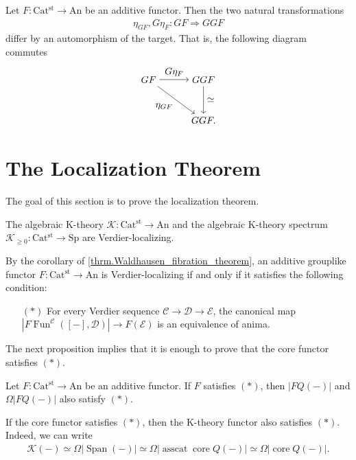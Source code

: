 \documentclass[a4paper,dvipdfmx,11pt,reqno]{amsart}
\DeclareMathOperator{\Fun}{Fun}
\DeclareMathOperator{\core}{core}
\DeclareMathOperator{\asscat}{asscat}
\DeclareMathOperator{\Span}{Span}
\newcommand{\C}{\mathcal{C}}
\newcommand{\D}{\mathcal{D}}
\newcommand{\E}{\mathcal{E}}
\newcommand{\K}{\mathcal{K}}
\newcommand{\An}{\mathrm{An}}
\newcommand{\Catst}{\mathrm{Cat^{st}}}
\newcommand{\Sp}{\mathrm{Sp}}
\begin{document}
\begin{proposition}
  Let $F : \Catst \to \An$ be an additive functor.
  Then the two natural transformations
  \begin{align*}
    \eta_{GF} , G\eta_{F} : GF \Rightarrow GGF
  \end{align*}
  differ by an automorphism of the target.
  That is, the following diagram commutes
  \[\begin{tikzpicture}[auto,->] 
    \node (tl) at (0,1.5) {$GF$}; 
    \node (tr) at (2,1.5) {$GGF$};
    \node (br) at (2,0) {$GGF.$}; 
    \draw (tl) -- node {$G\eta_{F}$} (tr); 
    \draw (tr) -- node {$\simeq$} (br); 
    \draw (tl) -- node[swap] {$\eta_{GF}$} (br);
  \end{tikzpicture}\] 
\end{proposition}


\section{The Localization Theorem}

The goal of this section is to prove the localization theorem.

\begin{theorem} \label{thrm.localization_theorem}
  The algebraic K-theory $\K : \Catst \to \An$ and the algebraic K-theory spectrum $\K_{\geq 0} : \Catst \to \Sp$ are Verdier-localizing.
\end{theorem}

By the corollary of \cref{thrm.Waldhausen_fibration_theorem}, an additive grouplike functor $F : \Catst \to \An$ is Verdier-localizing if and only if it satisfies the following condition:
\begin{itemize}
  \item[$(\ast)$] For every Verdier sequence $\C \to \D \to \E$, the canonical map $|F\Fun^{\C}([-],\D)| \to F(\E)$ is an equivalence of anima.
\end{itemize}

The next proposition implies that it is enough to prove that the core functor satisfies $(\ast)$.

\begin{proposition}
  Let $F : \Catst \to \An$ be an additive functor.
  If $F$ satisfies $(\ast)$, then $|FQ(-)|$ and $\Omega|FQ(-)|$ also satisfy $(\ast)$.
\end{proposition}

\begin{remark}
  If the core functor satisfies $(\ast)$, then the K-theory functor also satisfies $(\ast)$.
  Indeed, we can write 
  \begin{align*}
    \K(-) 
    \simeq \Omega|\Span(-)| 
    \simeq \Omega|\asscat\core Q(-)| 
    \simeq \Omega|\core Q(-)|.
  \end{align*}
\end{remark}
\end{document}
